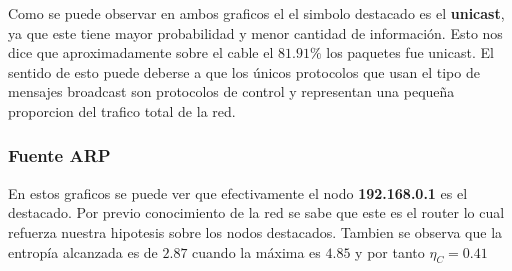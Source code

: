 Como se puede observar en ambos graficos el el simbolo 
destacado es el \textbf{unicast}, ya que este tiene mayor probabilidad
y menor cantidad de información. Esto nos dice que aproximadamente
sobre el cable el $81.91\%$ los paquetes fue unicast.
El sentido de esto puede deberse a que los únicos protocolos que
usan el tipo de mensajes broadcast son protocolos de control y representan
una pequeña proporcion del trafico total de la red.

\clearpage

\subsubsection{Fuente ARP}

\begin{figure}
	\begin{minipage}[b]{0.9\linewidth}
	\end{minipage}
\end{figure}

En estos graficos se puede ver que efectivamente el nodo \textbf{192.168.0.1}
es el destacado. Por previo conocimiento de la red se sabe que este
es el router lo cual refuerza nuestra hipotesis sobre los nodos destacados.
Tambien se observa que la entropía alcanzada es de $2.87$ cuando la máxima
es $4.85$ y por tanto $\eta_{C} = 0.41$

